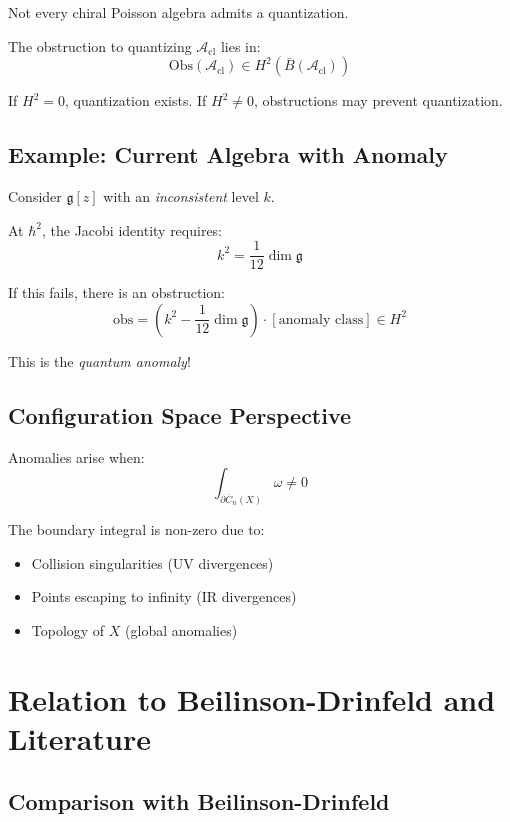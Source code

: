 Not every chiral Poisson algebra admits a quantization.

\begin{theorem}
The obstruction to quantizing $\mathcal{A}_{\text{cl}}$ lies in:
$$\text{Obs}(\mathcal{A}_{\text{cl}}) \in H^2(\bar{B}(\mathcal{A}_{\text{cl}}))$$

If $H^2 = 0$, quantization exists. If $H^2 \neq 0$, obstructions may prevent quantization.
\end{theorem}

\subsection{Example: Current Algebra with Anomaly}

Consider $\mathfrak{g}[z]$ with an \emph{inconsistent} level $k$.

At $\hbar^2$, the Jacobi identity requires:
$$k^2 = \frac{1}{12} \dim \mathfrak{g}$$

If this fails, there is an obstruction:
$$\text{obs} = (k^2 - \frac{1}{12}\dim\mathfrak{g}) \cdot [\text{anomaly class}] \in H^2$$

This is the \emph{quantum anomaly}!

\subsection{Configuration Space Perspective}

Anomalies arise when:
$$\int_{\partial \overline{C}_n(X)} \omega \neq 0$$

The boundary integral is non-zero due to:
\begin{itemize}
\item Collision singularities (UV divergences)
\item Points escaping to infinity (IR divergences)
\item Topology of $X$ (global anomalies)
\end{itemize}

\section{Relation to Beilinson-Drinfeld and Literature}

\subsection{Comparison with Beilinson-Drinfeld}

